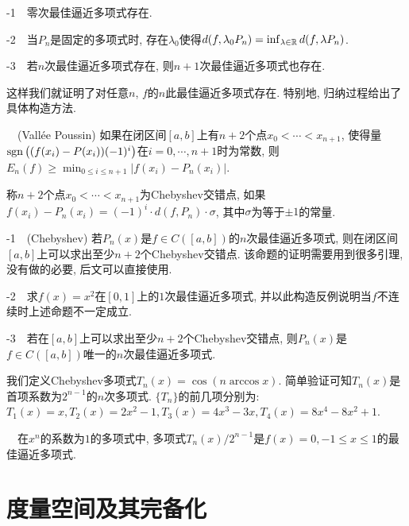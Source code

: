 -1~~零次最佳逼近多项式存在. 

-2~~当$P_n$是固定的多项式时, 存在$\lambda _0$使得$d(f,\lambda _0P_n) = \inf_{\lambda \in \mathbb{R}} d(f,\lambda P_n)$. 

-3~~若$n$次最佳逼近多项式存在, 则$n+1$次最佳逼近多项式也存在. 

\vspace{1em}
这样我们就证明了对任意$n$, $f$的$n$此最佳逼近多项式存在. 特别地, 归纳过程给出了具体构造方法. 
\vspace{1em}

~~(Vallée Poussin) 如果在闭区间$[a,b]$上有$n+2$个点$x_0 <\cdots <x_{n+1}$, 使得量$\operatorname{sgn} \big( (f(x_i)-P(x_i))(-1)^i \big)$在$i=0,\cdots ,n+1$时为常数, 则$E_n(f) \geq \min_{0 \leq i \leq n+1} |f(x_i)-P_n(x_i)|$. 
\vspace{1em}

称$n+2$个点$x_0 < \cdots < x_{n+1}$为Chebyshev交错点, 如果$f(x_i)-P_n(x_i) = (-1)^i \cdot d(f,P_n) \cdot \sigma$, 其中$\sigma$为等于$\pm 1$的常量. 

\vspace{1em}
-1~~(Chebyshev) 若$P_n(x)$是$f \in C([a,b])$的$n$次最佳逼近多项式, 则在闭区间$[a,b]$上可以求出至少$n+2$个Chebyshev交错点. {\color{blue}该命题的证明需要用到很多引理, 没有做的必要, 后文可以直接使用. }

-2~~求$f(x)=x^2$在$[0,1]$上的$1$次最佳逼近多项式, 并以此构造反例说明当$f$不连续时上述命题不一定成立. 

-3~~若在$[a,b]$上可以求出至少$n+2$个Chebyshev交错点, 则$P_n(x)$是$f \in C([a,b])${\color{blue}唯一}的$n$次最佳逼近多项式. 

\vspace{1em}
我们定义Chebyshev多项式$T_n(x)=\cos (n \arccos x)$. 简单验证可知$T_n(x)$是首项系数为$2^{n-1}$的$n$次多项式. $\{ T_n \}$的前几项分别为: $T_1(x)=x, T_2(x)=2x^2-1, T_3(x)=4x^3-3x, T_4(x)=8x^4-8x^2+1$. 
\vspace{1em}

~~在$x^n$的系数为$1$的多项式中, 多项式$T_n(x)/2^{n-1}$是$f(x)=0, -1 \leq x \leq 1$的最佳逼近多项式. 









\newpage
\section{度量空间及其完备化}

